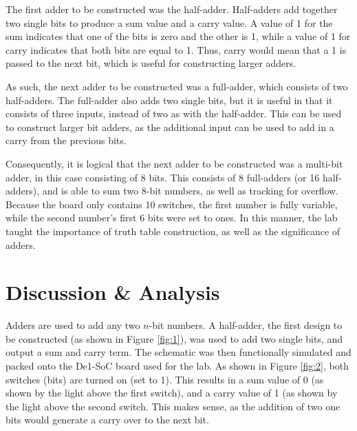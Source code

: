 \documentclass[
	letterpaper, %
	10pt, %
]{CSUniSchoolLabReport}
\begin{document}
\hspace{.5 in}    The first adder to be constructed was the half-adder. Half-adders add together two single bits to produce a sum value and a carry value. A value of 1 for the sum indicates that one of the bits is zero and the other is 1, while a value of 1 for carry indicates that both bits are equal to 1. Thus, carry would mean that a 1 is passed to the next bit, which is useful for constructing larger adders. \newline

\hspace{.5 in}    As such, the next adder to be constructed was a full-adder, which consists of two half-adders. The full-adder also adds two single bits, but it is useful in that it consists of three inputs, instead of two as with the half-adder. This can be used to construct larger bit adders, as the additional input can be used to add in a carry from the previous bits. \newline

\hspace{.5 in}    Consequently, it is logical that the next adder to be constructed was a multi-bit adder, in this case consisting of 8 bits. This consists of 8 full-adders (or 16 half-adders), and is able to sum two 8-bit numbers, as well as tracking for overflow. Because the board only contains 10 switches, the first number is fully variable, while the second number's first 6 bits were set to ones. In this manner, the lab taught the importance of truth table construction, as well as the significance of adders.

\section{Discussion \& Analysis} 

\hspace{.5 in} Adders are used to add any two $n$-bit numbers. A half-adder, the first design to be constructed (as shown in Figure \ref{fig:1}), was used to add two single bits, and output a sum and carry term. The schematic was then functionally simulated and packed onto the De1-SoC board used for the lab. As shown in Figure \ref{fig:2}, both switches (bits) are turned on (set to 1). This results in a sum value of 0 (as shown by the light above the first switch), and a carry value of 1 (as shown by the light above the second switch. This makes sense, as the addition of two one bits would generate a carry over to the next bit. \newline
\end{document}
